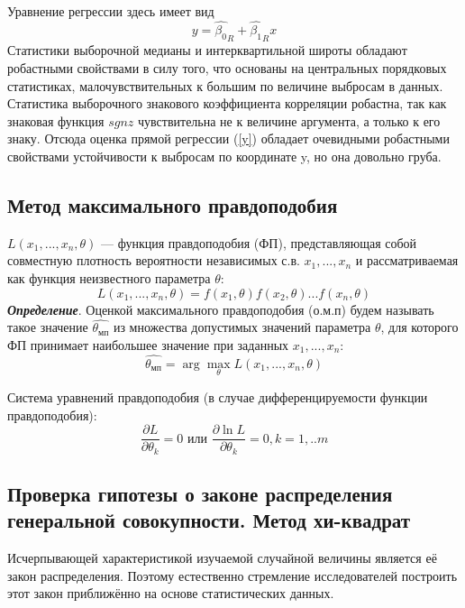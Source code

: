 \documentclass[12pt]{article}
\begin{document}
	Уравнение регрессии здесь имеет вид 
	\begin{equation}
		y = \hat{\beta_{0}}_{R} +  \hat{\beta_{1}}_{R}x
		\label{y}
	\end{equation}
	Статистики выборочной медианы и интерквартильной широты обладают робастными свойствами в силу того, что основаны на центральных порядковых статистиках, малочувствительных к большим по величине выбросам в данных. Статистика выборочного знакового коэффициента корреляции робастна, так как знаковая функция $sgn z$ чувствительна не к величине аргумента, а только к его знаку. Отсюда оценка прямой регрессии (\ref{y}) обладает очевидными робастными свойствами устойчивости к выбросам по координате y, но она довольно груба.
	
	\subsection{Метод максимального правдоподобия}
	$L(x_{1},... ,x_{n}, \theta)$ — функция правдоподобия (ФП), представляющая собой совместную плотность вероятности независимых с.в. $x_{1}, ... ,x_{n}$ и рассматриваемая как функция неизвестного параметра $\theta$:
	\begin{equation}
		L(x_{1},...,x_{n},\theta) = f(x_{1},\theta)f(x_{2},\theta)...f(x_{n}, \theta)
		\label{L()}
	\end{equation}
	\textbf{\textit{Определение}}. Оценкой максимального правдоподобия (о.м.п) будем называть такое значение $\hat{\theta_{мп}}$ из множества допустимых значений параметра $\theta$, для которого ФП принимает наибольшее значение при заданных $x_{1},...,x_{n}$:
	\begin{equation}
		\hat{\theta_{мп}} = \arg \max_{\theta}L(x_{1},...,x_{n},\theta)
		\label{theta_mp}
	\end{equation}
	
	Система уравнений правдоподобия (в случае дифференцируемости функции правдоподобия):
	\begin{equation}
		\frac{\partial L}{\partial \theta_{k}} = 0 \text{  или  } \frac{\partial \ln L}{\partial \theta_{k}} = 0, k = 1,..m
	\end{equation}
	
	\subsection{Проверка гипотезы о законе распределения генеральной совокупности. Метод хи-квадрат}
	Исчерпывающей характеристикой изучаемой случайной величины является её закон распределения. Поэтому естественно стремление исследователей построить этот закон приближённо на основе статистических данных.
	
\end{document}
